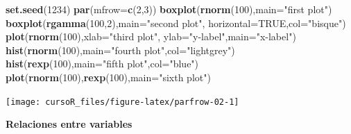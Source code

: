 \documentclass[]{book}
\newenvironment{Shaded}{\begin{snugshade}}{\end{snugshade}}
\newcommand{\KeywordTok}[1]{\textcolor[rgb]{0.13,0.29,0.53}{\textbf{#1}}}
\newcommand{\DataTypeTok}[1]{\textcolor[rgb]{0.13,0.29,0.53}{#1}}
\newcommand{\DecValTok}[1]{\textcolor[rgb]{0.00,0.00,0.81}{#1}}
\newcommand{\StringTok}[1]{\textcolor[rgb]{0.31,0.60,0.02}{#1}}
\newcommand{\OtherTok}[1]{\textcolor[rgb]{0.56,0.35,0.01}{#1}}
\newcommand{\NormalTok}[1]{#1}
\begin{document}
\begin{Shaded}
\begin{Highlighting}[]
\KeywordTok{set.seed}\NormalTok{(}\DecValTok{1234}\NormalTok{)}
 \KeywordTok{par}\NormalTok{(}\DataTypeTok{mfrow=}\KeywordTok{c}\NormalTok{(}\DecValTok{2}\NormalTok{,}\DecValTok{3}\NormalTok{))}
 \KeywordTok{boxplot}\NormalTok{(}\KeywordTok{rnorm}\NormalTok{(}\DecValTok{100}\NormalTok{),}\DataTypeTok{main=}\StringTok{"first plot"}\NormalTok{)}
 \KeywordTok{boxplot}\NormalTok{(}\KeywordTok{rgamma}\NormalTok{(}\DecValTok{100}\NormalTok{,}\DecValTok{2}\NormalTok{),}\DataTypeTok{main=}\StringTok{"second plot"}\NormalTok{, }\DataTypeTok{horizontal=}\OtherTok{TRUE}\NormalTok{,}\DataTypeTok{col=}\StringTok{"bisque"}\NormalTok{)}
 \KeywordTok{plot}\NormalTok{(}\KeywordTok{rnorm}\NormalTok{(}\DecValTok{100}\NormalTok{),}\DataTypeTok{xlab=}\StringTok{"third plot"}\NormalTok{,}
      \DataTypeTok{ylab=}\StringTok{"y-label"}\NormalTok{,}\DataTypeTok{main=}\StringTok{"x-label"}\NormalTok{)}
 \KeywordTok{hist}\NormalTok{(}\KeywordTok{rnorm}\NormalTok{(}\DecValTok{100}\NormalTok{),}\DataTypeTok{main=}\StringTok{"fourth plot"}\NormalTok{,}\DataTypeTok{col=}\StringTok{"lightgrey"}\NormalTok{)}
 \KeywordTok{hist}\NormalTok{(}\KeywordTok{rexp}\NormalTok{(}\DecValTok{100}\NormalTok{),}\DataTypeTok{main=}\StringTok{"fifth plot"}\NormalTok{,}\DataTypeTok{col=}\StringTok{"blue"}\NormalTok{)}
 \KeywordTok{plot}\NormalTok{(}\KeywordTok{rnorm}\NormalTok{(}\DecValTok{100}\NormalTok{),}\KeywordTok{rexp}\NormalTok{(}\DecValTok{100}\NormalTok{),}\DataTypeTok{main=}\StringTok{"sixth plot"}\NormalTok{)}
\end{Highlighting}
\end{Shaded}

\begin{center}\texttt{[image: cursoR\_files/figure-latex/parfrow-02-1]} \end{center}

\textbf{Relaciones entre variables}
\end{document}
